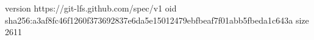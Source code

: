 version https://git-lfs.github.com/spec/v1
oid sha256:a3af8fc46f1260f373692837e6da5e15012479ebfbeaf7f01abb5fbeda1c643a
size 2611
